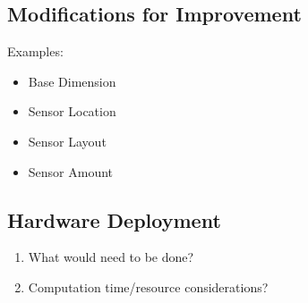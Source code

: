 \documentclass[10pt,journal,compsoc]{IEEEtran}
\begin{document}
\subsection{Modifications for Improvement}
Examples:
\begin{itemize}
\item Base Dimension
\item Sensor Location
\item Sensor Layout
\item Sensor Amount
\end{itemize}

\subsection{Hardware Deployment}
\begin{enumerate}
\item What would need to be done?
\item Computation time/resource considerations?
\end{enumerate}





\end{document}

